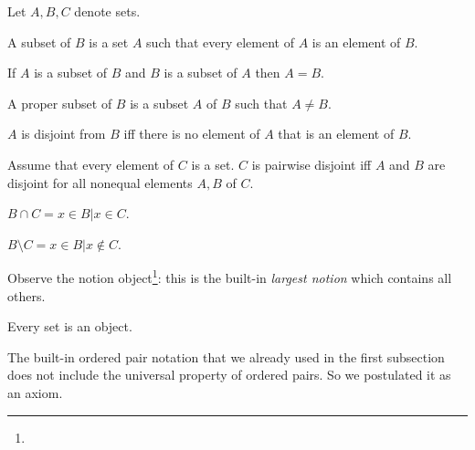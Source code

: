 \begin{forthel}
    Let $A,B,C$ denote sets.

    \begin{definition}
        A subset of $B$ is a set $A$ such that
        every element of $A$ is an element of $B$.
    \end{definition}

    \begin{axiom}[Extensionality]
        If $A$ is a subset of $B$ and
        $B$ is a subset of $A$ then $A = B$.
    \end{axiom}

    \begin{definition}
        A proper subset of $B$ is a subset $A$ of $B$ such that $A\neq B$.
    \end{definition}

    \begin{definition}
        $A$ is disjoint from $B$ iff there is no element of $A$ that is an element of $B$.
    \end{definition}

    \begin{definition}
        Assume that every element of $C$ is a set.
        $C$ is pairwise disjoint iff $A$ and $B$ are disjoint for all nonequal
        elements $A, B$ of $C$.
    \end{definition}


    \begin{definition}
        $B \cap C = { x \in B | x \in C}$.
    \end{definition}

    \begin{definition}
        $B \setminus C = { x \in B | x \notin C}$.
    \end{definition}
\end{forthel}

Observe the notion \textsf{object}\footnote{}:
this is the built-in \textit{largest notion} which contains all others.

\begin{forthel}
    \begin{lemma}
        Every set is an object.
    \end{lemma}
\end{forthel}

The built-in ordered pair {notation} that we already used in the first
subsection does not include the universal property of ordered pairs.
So we postulated it as an axiom.

